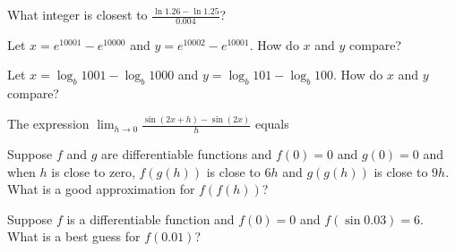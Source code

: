 \documentclass{ximera}
\newcommand{\recommendation}[1]{}
\newcommand{\GoodQuestions}[1]{}
\begin{document}
\begin{shuffle}
\begin{problem}
  What integer is closest to $\frac{\ln 1.26 - \ln 1.25}{0.004}$?
  \begin{multipleChoice}
  \end{multipleChoice}
\end{problem}

\begin{problem}
  Let $x = e^{10001} - e^{10000}$ and $y = e^{10002} - e^{10001}$.  How do $x$ and $y$ compare?
  \begin{multipleChoice}
  \end{multipleChoice}
\end{problem}

\begin{problem}
  Let $x = \log_b 1001 - \log_b 1000$ and $y = \log_b 101 - \log_b 100$.  How do $x$ and $y$ compare?
  \begin{multipleChoice}
  \end{multipleChoice}
\end{problem}

\begin{problem}
  The expression $\lim_{h\to 0}\frac{\sin (2x+h)-\sin (2x)}{h}$ equals
  \begin{multipleChoice}
  \end{multipleChoice}
\end{problem}

\begin{problem}
  Suppose $f$ and $g$ are differentiable functions and $f(0) = 0$ and
  $g(0) = 0$ and when $h$ is close to zero, $f(g(h))$ is close to $6h$
  and $g(g(h))$ is close to $9h$.  What is a good approximation for $f(f(h))$?
  \begin{multipleChoice}
  \end{multipleChoice}
\end{problem}

\begin{problem}
  Suppose $f$ is a differentiable function and $f(0) = 0$ and
  $f(\sin 0.03) = 6$.  What is a best guess for $f(0.01)$?
  \begin{multipleChoice}
  \end{multipleChoice}
\end{problem}


\end{shuffle}
\end{document}
